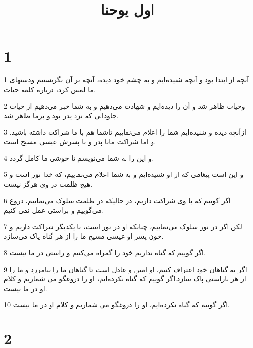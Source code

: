 

\title{اول يوحنا}


\chapter{1}

\par 1 آنچه از ابتدا بود و آنچه شنیده‌ایم و به چشم خود دیده، آنچه بر آن نگریستیم ودستهای ما لمس کرد، درباره کلمه حیات.
\par 2 وحیات ظاهر شد و آن را دیده‌ایم و شهادت می‌دهیم و به شما خبر می‌دهیم از حیات جاودانی که نزد پدر بود و برما ظاهر شد.
\par 3 ازآنچه دیده و شنیده‌ایم شما را اعلام می‌نماییم تاشما هم با ما شراکت داشته باشید. و اما شراکت مابا پدر و با پسرش عیسی مسیح است.
\par 4 و این را به شما می‌نویسم تا خوشی ما کامل گردد.
\par 5 و این است پیغامی که از او شنیده‌ایم و به شما اعلام می‌نماییم، که خدا نور است و هیچ ظلمت در وی هرگز نیست.
\par 6 اگر گوییم که با وی شراکت داریم، در حالیکه در ظلمت سلوک می‌نماییم، دروغ می‌گوییم و براستی عمل نمی کنیم.
\par 7 لکن اگر در نور سلوک می‌نماییم، چنانکه او در نور است، با یکدیگر شراکت داریم و خون پسر او عیسی مسیح ما را از هر گناه پاک می‌سازد.
\par 8 اگر گوییم که گناه نداریم خود را گمراه می‌کنیم و راستی در ما نیست.
\par 9 اگر به گناهان خود اعتراف کنیم، او امین و عادل است تا گناهان ما را بیامرزد و ما را از هر ناراستی پاک سازد.اگر گوییم که گناه نکرده‌ایم، او را دروغگو می شماریم و کلام او در ما نیست.
\par 10 اگر گوییم که گناه نکرده‌ایم، او را دروغگو می شماریم و کلام او در ما نیست.

\chapter{2}

